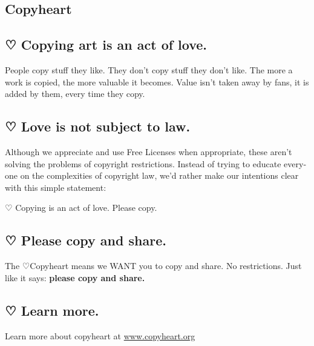 \newpage
\begin{english}
\section*{Copyheart}

\subsection*{ {\dejavu ♡} Copying art is an act of love.}

People copy stuff they like. They don’t copy stuff they don’t like. The more a work is copied, the more valuable it becomes. Value isn’t taken away by fans, it is added by them, every time they copy.

\subsection*{ {\dejavu ♡} Love is not subject to law.}

Although we appreciate and use Free Licenses when appropriate, these aren’t solving the problems of copyright restrictions. Instead of trying to educate everyone on the complexities of copyright law, we’d rather make our intentions clear with this simple statement:

\begin{framed}
   \begin{center} {\dejavu ♡} Copying is an act of love. Please copy. \end{center}
\end{framed}

\subsection*{ {\dejavu ♡} Please copy and share.}

The {\dejavu ♡}Copyheart means we WANT you to copy and share. No restrictions. Just like it says: \textbf{please copy and share.}
\subsection*{ {\dejavu ♡} Learn more.}
Learn more about copyheart at \url{www.copyheart.org}
\end{english}
